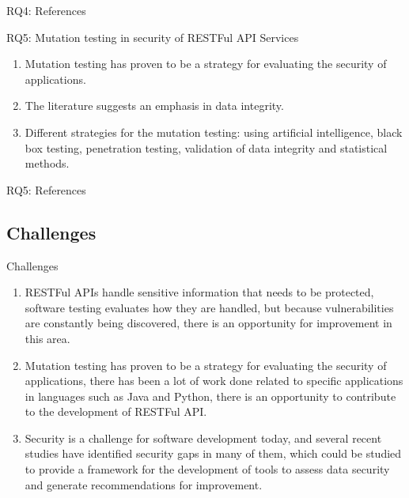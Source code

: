\documentclass[10pt]{beamer}
\theoremstyle{remark}
\theoremstyle{definition}
\begin{document}
  \begin{frame}{RQ4: References}
    \printbibliography[keyword={RQ4}]
  \end{frame}

  \begin{frame}{RQ5: Mutation testing in security of RESTFul API Services}
    \begin{enumerate}
      \item Mutation testing has proven to be a strategy for evaluating the security of applications.
      \item The literature suggests an emphasis in data integrity.
      \item Different strategies for the mutation testing: using artificial intelligence, black box testing, penetration testing, validation of data integrity and statistical methods.
    \end{enumerate}
  \end{frame}

  \begin{frame}{RQ5: References}
   \printbibliography[keyword={RQ5}]
  \end{frame}

\subsection{Challenges}

\begin{frame}{Challenges}
\begin{enumerate} e
    \item RESTFul APIs handle sensitive information that needs to be protected, software testing evaluates how they are handled, but because vulnerabilities are constantly being discovered, there is an opportunity for improvement in this area.
    \item Mutation testing has proven to be a strategy for evaluating the security of applications, there has been a lot of work done related to specific applications in languages such as Java and Python, there is an opportunity to contribute to the development of RESTFul API.
    \item Security is a challenge for software development today, and several recent studies have identified security gaps in many of them, which could be studied to provide a framework for the development of tools to assess data security and generate recommendations for improvement.
\end{enumerate}
\end{frame}
\end{document}
